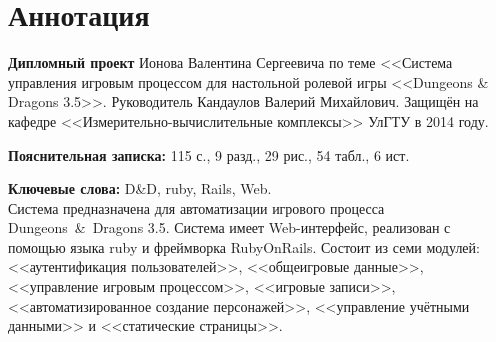 

\section*{Аннотация}
\noindent\textbf{Дипломный проект} Ионова Валентина Сергеевича по теме <<Система управления игровым процессом для настольной ролевой игры <<Dungeons \& Dragons 3.5>>.
Руководитель Кандаулов Валерий Михайлович. Защищён на кафедре <<Измерительно-вычислительные комплексы>> УлГТУ в 2014 году.

\noindent\textbf{Пояснительная записка:} 115 с., 9 разд., 29 рис., 54 табл., 6 ист.

\noindent\textbf{Ключевые слова:} D\&D, ruby, Rails, Web.\\[1cm]
\noindent Система предназначена для автоматизации игрового процесса Dungeons~\&~Dragons 3.5. Система имеет Web-интерфейс, реализован с помощью языка ruby и фреймворка RubyOnRails. Состоит из семи модулей: <<аутентификация пользователей>>, <<общеигровые данные>>, <<управление игровым процессом>>, <<игровые записи>>, <<автоматизированное создание персонажей>>, <<управление учётными данными>> и <<статические страницы>>.


\restoregeometry
